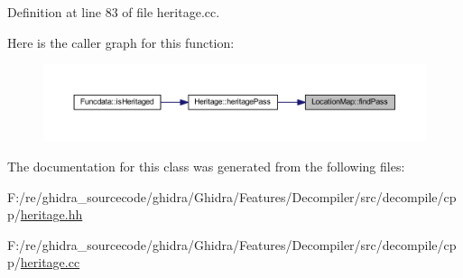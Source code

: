 Definition at line 83 of file heritage.\+cc.

Here is the caller graph for this function\+:
\nopagebreak
\begin{figure}[H]
\begin{center}
\leavevmode
\includegraphics[width=350pt]{class_location_map_aa4e4c0f548533f8607a706cf7796c789_icgraph}
\end{center}
\end{figure}


The documentation for this class was generated from the following files\+:\begin{DoxyCompactItemize}
\item 
F\+:/re/ghidra\+\_\+sourcecode/ghidra/\+Ghidra/\+Features/\+Decompiler/src/decompile/cpp/\mbox{\hyperlink{heritage_8hh}{heritage.\+hh}}\item 
F\+:/re/ghidra\+\_\+sourcecode/ghidra/\+Ghidra/\+Features/\+Decompiler/src/decompile/cpp/\mbox{\hyperlink{heritage_8cc}{heritage.\+cc}}\end{DoxyCompactItemize}
